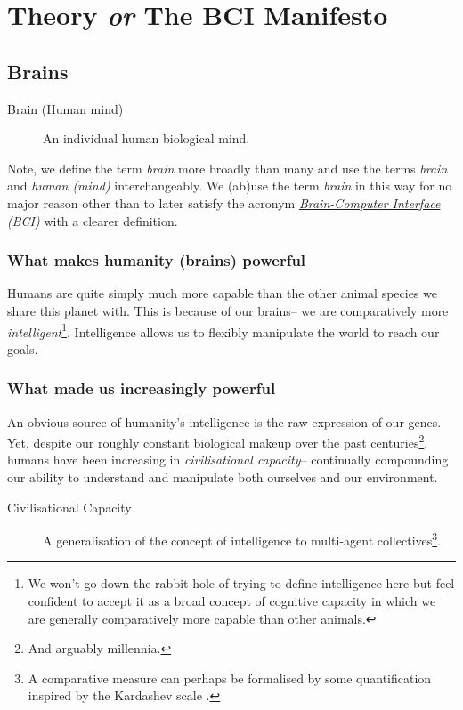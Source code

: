 \documentclass[logo,bsc,singlespacing,parskip]{infthesis}
\begin{document}
\part{Theory \emph{or} The BCI Manifesto}
\label{sec:orge0d2df2}
\chapter{Brains}
\label{sec:org3af2793}
\begin{mdframed}
\begin{description}
\item[{Brain\label{Brain} (Human mind\label{Human mind})}] An individual human biological mind.
\end{description}
\end{mdframed}

Note, we define the term \emph{brain} more broadly than many and use the terms \emph{brain} and \emph{human (mind)} interchangeably.
We (ab)use the term \emph{brain} in this way for no major reason other than to later satisfy the acronym \emph{\hyperref[org75a7ab5]{Brain-Computer Interface} (BCI)} with a clearer definition.
\section{What makes humanity (brains) powerful}
\label{sec:orgb436956}
Humans are quite simply much more capable than the other animal species we share this planet with.
This is because of our brains-- we are comparatively more \emph{intelligent}\footnote{We won't go down the rabbit hole of trying to define intelligence here but feel confident to accept it as a broad concept of cognitive capacity in which we are generally comparatively more capable than other animals.}.
Intelligence allows us to flexibly manipulate the world to reach our goals.

\section{What made us increasingly powerful}
\label{sec:org95ac978}
An obvious source of humanity's intelligence is the raw expression of our genes.
Yet, despite our roughly constant biological makeup over the past centuries\footnote{And arguably millennia.}, humans have been increasing in \emph{civilisational capacity}--  continually compounding our ability to understand and manipulate both ourselves and our environment.

\begin{mdframed}
\begin{description}
\item[{Civilisational Capacity\label{Civilisational Capacity}}] A generalisation of the concept of intelligence to multi-agent collectives\footnote{A comparative measure can perhaps be formalised by some quantification inspired by the Kardashev scale \autocite{kardashevTransmissionInformationExtraterrestrial1964}.}.
\end{description}
\end{mdframed}
\end{document}
